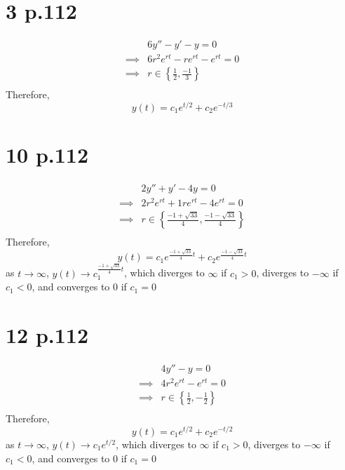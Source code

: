 \documentclass[11pt]{report}
\begin{document}
\section*{3 p.112}
\begin{equation*}
    \begin{aligned}
        & 6y'' - y'-y = 0 \\
        \implies & 6r^2 e^{rt} - re^{rt} - e^{rt} = 0 \\
        \implies & r \in \left\{ \frac{1}{2}, \frac{-1}{3} \right\} \\
    \end{aligned}
\end{equation*}
Therefore,
\[
    y(t) = c_1e^{t/2} + c_2e^{-t/3}
\]
\newpage
\section*{10 p.112}
\begin{equation*}
    \begin{aligned}
        & 2y'' + y'-4y = 0 \\
        \implies & 2r^2 e^{rt} + 1re^{rt} - 4e^{rt} = 0 \\
        \implies & r \in \left\{\frac{-1 + \sqrt{33}}{4},  \frac{-1 - \sqrt{33}}{4}\right\} \\
    \end{aligned}
\end{equation*}
Therefore,
\[
    y(t) = c_1e^{\frac{-1 + \sqrt{33}}{4}t} + c_2e^{\frac{-1 - \sqrt{33}}{4}t}
\]
as $t \to \infty$, $y(t) \to c_1^{\frac{-1 + \sqrt{33}}{4}t}$,
which diverges to $\infty$ if $c_1>0$, diverges to $-\infty$ if $c_1 < 0$, and converges to $0$ if $c_1 = 0$
\newpage
\section*{12 p.112}
\begin{equation*}
    \begin{aligned}
        & 4y'' - y = 0 \\
        \implies & 4r^2 e^{rt} - e^{rt} = 0 \\
        \implies & r \in \left\{\frac{1}{2},  -\frac{1}{2}\right\} \\
    \end{aligned}
\end{equation*}
Therefore,
\[
    y(t) = c_1e^{t/2} + c_2e^{-t/2}
\]
as $t \to \infty$, $y(t) \to c_1e^{t/2}$,
which diverges to $\infty$ if $c_1>0$, diverges to $-\infty$ if $c_1 < 0$, and converges to $0$ if $c_1 = 0$
\end{document}
